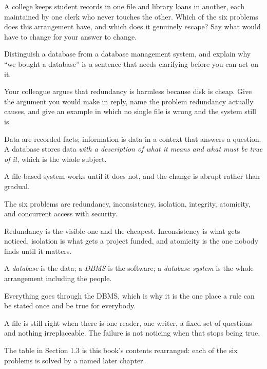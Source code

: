 \begin{checkpoint}
\begin{tightnum}
  \item A college keeps student records in one file and library loans in
        another, each maintained by one clerk who never touches the other.
        Which of the six problems does this arrangement have, and which does it
        genuinely escape? Say what would have to change for your answer to
        change.
  \item Distinguish a database from a database management system, and explain
        why ``we bought a database'' is a sentence that needs clarifying before
        you can act on it.
  \item Your colleague argues that redundancy is harmless because disk is
        cheap. Give the argument you would make in reply, name the problem
        redundancy actually causes, and give an example in which no single file
        is wrong and the system still is.
\end{tightnum}
\end{checkpoint}

\begin{chaptersummary}
\begin{tight}
  \item Data are recorded facts; information is data in a context that answers
        a question. A database stores data \emph{with a description of what it
        means and what must be true of it}, which is the whole subject.
  \item A file-based system works until it does not, and the change is abrupt
        rather than gradual.
  \item The six problems are redundancy, inconsistency, isolation, integrity,
        atomicity, and concurrent access with security.
  \item Redundancy is the visible one and the cheapest. Inconsistency is what
        gets noticed, isolation is what gets a project funded, and atomicity is
        the one nobody finds until it matters.
  \item A \emph{database} is the data; a \emph{DBMS} is the software; a
        \emph{database system} is the whole arrangement including the people.
  \item Everything goes through the DBMS, which is why it is the one place a
        rule can be stated once and be true for everybody.
  \item A file is still right when there is one reader, one writer, a fixed set
        of questions and nothing irreplaceable. The failure is not noticing
        when that stops being true.
  \item The table in Section 1.3 is this book's contents rearranged: each of
        the six problems is solved by a named later chapter.
\end{tight}
\end{chaptersummary}

